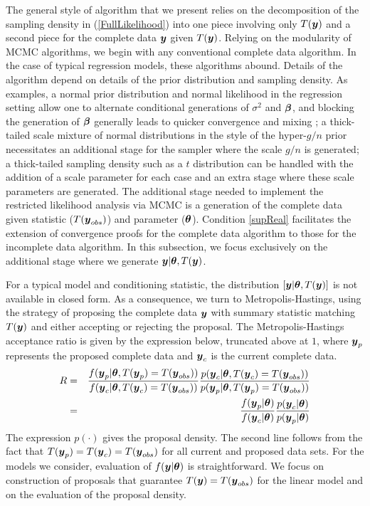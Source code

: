 \documentclass[12pt]{article}
\def\bth{\mbox{\boldmath $\theta$}}
\def\bbeta{\mbox{\boldmath $\beta$}}
\newcommand{\by}{\mbox{\boldmath $y$}}
\begin{document}
The general style of algorithm that we present relies on the decomposition of the sampling density in (\ref{FullLikelihood})
into one piece involving only $T(\by)$ and a second piece for the
complete data $\by$ given $T(\by)$. 
Relying on the modularity of MCMC algorithms, we begin with any conventional complete data algorithm.  In the case of typical regression models, these algorithms abound.  Details of the algorithm depend on details of
the prior distribution and sampling density.  As examples, a normal
prior distribution and normal likelihood in the regression setting
allow one to alternate conditional generations of $\sigma^2$ and $\bbeta$, and blocking the generation of $\bbeta$ generally
leads to quicker convergence and mixing \citep{liu1994}; a thick-tailed scale mixture of normal distributions
in the style of the 
hyper-$g/n$ prior \citep{liang2008} necessitates an additional stage for the sampler where the scale 
$g/n$ is generated; a thick-tailed sampling density such as a $t$ distribution can be handled with the addition of 
a scale parameter for each case and an extra stage where these scale parameters are generated.  
The additional stage needed to implement the restricted likelihood analysis via MCMC 
is a generation of the complete data given statistic ($T(\by_{obs})$) and parameter ($\bth$).  Condition \ref{supReal} facilitates the extension of convergence proofs for the complete data algorithm to those for the incomplete data algorithm.  
In this subsection, we focus exclusively on the additional stage
where we generate $\by | \bth, T(\by)$.  

For a typical model and conditioning statistic, the distribution $[\by | \bth, T(\by)]$ is not available in closed form.  
As a consequence, we turn to Metropolis-Hastings, using the strategy of proposing the complete data $\by$ 
with summary statistic matching $T(\by)$ and
either accepting or rejecting the proposal.  
The Metropolis-Hastings acceptance ratio is given by the expression
below, truncated above at $1$, where $\by_p$ represents the proposed complete data and $\by_c$ is the current 
complete data.  
\begin{eqnarray}
\label{MHRatio}
R & = & \frac{f(\by_p|\bth,T(\by_p)=T(\by_{obs}))}{f(\by_c|\bth,T(\by_c)=T(\by_{obs}))}  
                \frac{p(\by_c|\bth,T(\by_c) = T(\by_{obs}))}{p(\by_p|\bth,T(\by_p) = T(\by_{obs}))} \\
 & = & \frac{f(\by_p|\bth)}{f(\by_c|\bth)} \frac{p(\by_c|\bth)}{p(\by_p|\bth)}
\end{eqnarray}
The expression $p(\cdot)$ gives the proposal density.  
The second line follows from the fact that $T(\by_p) = T(\by_c) = T(\by_{obs})$ for all 
current and proposed data sets.  For the models we consider,
evaluation of $f(\by | \bth)$ is straightforward.  We 
focus on construction of proposals that guarantee $T(\by) = T(\by_{obs})$ for the linear model and on the evaluation of 
the proposal density.  
\end{document}
